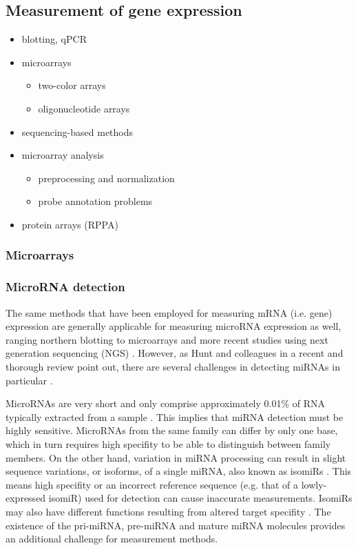 \subsection{Measurement of gene expression}\label{measurement-of-gene-expression}

\begin{itemize}
  \item blotting, qPCR
  \item microarrays
  \begin{itemize}
    \item two-color arrays
    \item oligonucleotide arrays
  \end{itemize}
  \item sequencing-based methods
  \item microarray analysis
  \begin{itemize}
    \item preprocessing and normalization
    \item probe annotation problems
  \end{itemize}
  \item protein arrays (RPPA)
\end{itemize}


\subsubsection{Microarrays}


\subsubsection{MicroRNA detection}

The same methods that have been employed for measuring mRNA (i.e. gene)
expression are generally applicable for measuring microRNA expression as well,
ranging northern blotting to microarrays and more recent studies using next
generation sequencing (NGS) \citep{Huang2011}. However, as Hunt and colleagues
in a recent and thorough review point out, there are several challenges in
detecting miRNAs in particular \citep{Hunt2015}.

MicroRNAs are very short and only comprise approximately 0.01\% of RNA
typically extracted from a sample \citep{Dong2013}. This implies that miRNA
detection must be highly sensitive. MicroRNAs from the same family can differ
by only one base, which in turn requires high specifity to be able to
distinguish between family members. On the other hand, variation in miRNA
processing can result in slight sequence variations, or isoforms, of a single
miRNA, also known as isomiRs \citep{StaregaRoslan2011,Lee2010}. This means
high specifity or an incorrect reference sequence (e.g. that of a lowly-
expressed isomiR) used for detection can cause inaccurate measurements.
IsomiRs may also have different functions resulting from altered target
specifity \citep{Chugh2012}. The existence of the pri-miRNA, pre-miRNA and
mature miRNA molecules provides an additional challenge for measurement
methods.

